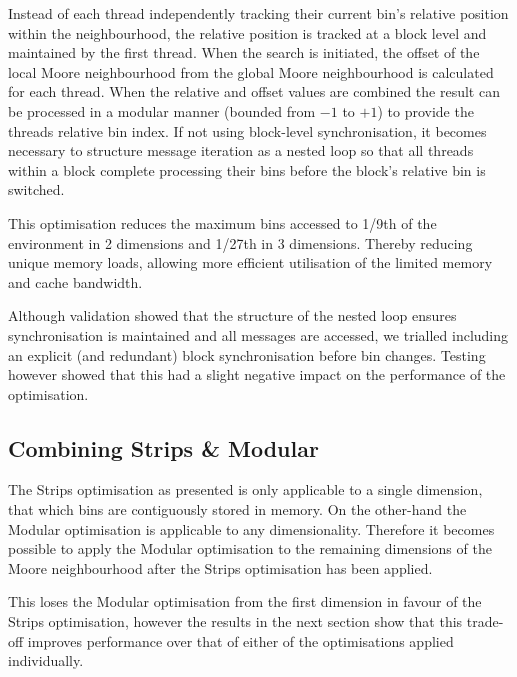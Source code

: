     Instead of each thread independently tracking their current bin's relative position within the neighbourhood, the relative position is tracked at a block level and maintained by the first thread. When the search is initiated, the offset of the local Moore neighbourhood from the global Moore neighbourhood is calculated for each thread. When the relative and offset values are combined the result can be processed in a modular manner (bounded from $-1$ to $+1$) to provide the threads relative bin index. If not using block-level synchronisation, it becomes necessary to structure message iteration as a nested loop so that all threads within a block complete processing their bins before the block's relative bin is switched.
    
    This optimisation reduces the maximum bins accessed to 1/9th of the environment in 2 dimensions and 1/27th in 3 dimensions. Thereby reducing unique memory loads, allowing more efficient utilisation of the limited memory and cache bandwidth.
    
    Although validation showed that the structure of the nested loop ensures synchronisation is maintained and all messages are accessed, we trialled including an explicit (and redundant) block synchronisation before bin changes. Testing however showed that this had a slight negative impact on the performance of the optimisation.

  \subsection{Combining Strips \& Modular}
    The Strips optimisation as presented is only applicable to a single dimension, that which bins are contiguously stored in memory. On the other-hand the Modular optimisation is applicable to any dimensionality. Therefore it becomes possible to apply the Modular optimisation to the remaining dimensions of the Moore neighbourhood after the Strips optimisation has been applied.
    
    This loses the Modular optimisation from the first dimension in favour of the Strips optimisation, however the results in the next section show that this trade-off improves performance over that of either of the optimisations applied individually.
    
